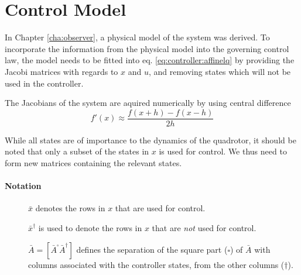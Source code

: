 \section{Control Model}
\label{sec:controller:model}
    In Chapter \ref{cha:observer}, a physical model of the system
    was derived. To incorporate the information from the physical model
    into the governing control law, the model needs to be fitted into eq.
    \eqref{eq:controller:affinelq} by providing the Jacobi matrices with
    regards to $x$ and $u$, and removing states which will not be
    used in the controller.

    The Jacobians of the system are aquired numerically by using
    central difference
    \begin{equation}
        f'(x) \approx \frac{f(x+h) - f(x-h)}{2h}
    \end{equation}

    While all states are of importance to the dynamics of the quadrotor,
    it should be noted that only a subset of the states in $x$ is used for control.
    We thus need to form new matrices containing the relevant states.
    \paragraph{Notation}
    \begin{description}
        \item[] $\bar{x}$ denotes the rows in $x$ that are used for control.
        \item[] $\bar{x}^{\dagger}$ is used to denote the rows in $x$ that are \textit{not} used for control.
        \item[] $\bar{A} = [ \bar{A}^{\square} \bar{A}^{\dagger}]$
        defines the separation of the square part ($\square$) of $\bar{A}$ with columns
        associated with the controller states, from the other columns ($\dagger$).
    \end{description}

